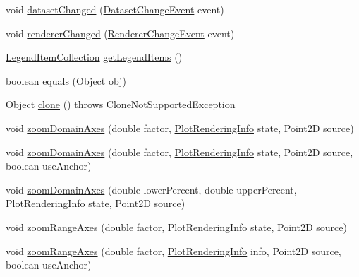 \begin{DoxyCompactItemize}
\item 
void \mbox{\hyperlink{classorg_1_1jfree_1_1chart_1_1plot_1_1_polar_plot_a8881e298d2cedacb87d1137c6dcc2c50}{dataset\+Changed}} (\mbox{\hyperlink{classorg_1_1jfree_1_1data_1_1general_1_1_dataset_change_event}{Dataset\+Change\+Event}} event)
\item 
void \mbox{\hyperlink{classorg_1_1jfree_1_1chart_1_1plot_1_1_polar_plot_a1e6333d6d221bf28fa136ffa681a0a16}{renderer\+Changed}} (\mbox{\hyperlink{classorg_1_1jfree_1_1chart_1_1event_1_1_renderer_change_event}{Renderer\+Change\+Event}} event)
\item 
\mbox{\hyperlink{classorg_1_1jfree_1_1chart_1_1_legend_item_collection}{Legend\+Item\+Collection}} \mbox{\hyperlink{classorg_1_1jfree_1_1chart_1_1plot_1_1_polar_plot_a3581c61aafa174b1f10952d312a2c9d1}{get\+Legend\+Items}} ()
\item 
boolean \mbox{\hyperlink{classorg_1_1jfree_1_1chart_1_1plot_1_1_polar_plot_a0e824e5477fded3b4681364de2c29821}{equals}} (Object obj)
\item 
Object \mbox{\hyperlink{classorg_1_1jfree_1_1chart_1_1plot_1_1_polar_plot_ac2eb5be3682193e569b1dcd8ed612d63}{clone}} ()  throws Clone\+Not\+Supported\+Exception 
\item 
void \mbox{\hyperlink{classorg_1_1jfree_1_1chart_1_1plot_1_1_polar_plot_a6f3f86ba882010148e0529af67b04354}{zoom\+Domain\+Axes}} (double factor, \mbox{\hyperlink{classorg_1_1jfree_1_1chart_1_1plot_1_1_plot_rendering_info}{Plot\+Rendering\+Info}} state, Point2D source)
\item 
void \mbox{\hyperlink{classorg_1_1jfree_1_1chart_1_1plot_1_1_polar_plot_aa78eed5e4d9f39f5422ffda8713ba596}{zoom\+Domain\+Axes}} (double factor, \mbox{\hyperlink{classorg_1_1jfree_1_1chart_1_1plot_1_1_plot_rendering_info}{Plot\+Rendering\+Info}} state, Point2D source, boolean use\+Anchor)
\item 
void \mbox{\hyperlink{classorg_1_1jfree_1_1chart_1_1plot_1_1_polar_plot_ad96a8912dd48c5e3b0bb22351c4427ad}{zoom\+Domain\+Axes}} (double lower\+Percent, double upper\+Percent, \mbox{\hyperlink{classorg_1_1jfree_1_1chart_1_1plot_1_1_plot_rendering_info}{Plot\+Rendering\+Info}} state, Point2D source)
\item 
void \mbox{\hyperlink{classorg_1_1jfree_1_1chart_1_1plot_1_1_polar_plot_a1ca0d4ba1f8474c0ebd3e52b3b0f3fac}{zoom\+Range\+Axes}} (double factor, \mbox{\hyperlink{classorg_1_1jfree_1_1chart_1_1plot_1_1_plot_rendering_info}{Plot\+Rendering\+Info}} state, Point2D source)
\item 
void \mbox{\hyperlink{classorg_1_1jfree_1_1chart_1_1plot_1_1_polar_plot_a1b8c2c7c975e4fb6cfce5a0803f823c0}{zoom\+Range\+Axes}} (double factor, \mbox{\hyperlink{classorg_1_1jfree_1_1chart_1_1plot_1_1_plot_rendering_info}{Plot\+Rendering\+Info}} info, Point2D source, boolean use\+Anchor)

\end{DoxyCompactItemize}
